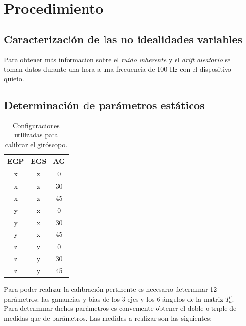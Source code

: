 \documentclass[main]{subfiles}
\begin{document}
\section{Procedimiento}
\subsection{Caracterización de las no idealidades variables}

Para obtener más información sobre el \emph{ruido inherente} y el \emph{drift aleatorio} se toman datos durante una hora a una frecuencia de 100 Hz con el dispositivo quieto.

\subsection{Determinación de parámetros estáticos}

\begin{table}
\vspace{-15pt}
\centering
\begin{small}
\begin{tabular}{|c|c|c|}
\hline
  {\cellcolor[gray]{0.85} \centering \textbf{EGP}}
& {\cellcolor[gray]{0.85} \centering \textbf{EGS}}
& {\cellcolor[gray]{0.85} \centering \textbf{AG}} \\ \hline  \hline
x & z & 0 \\ \hline
x & z & 30 \\ \hline
x & z & 45 \\ \hline
y & x & 0 \\ \hline
y & x & 30 \\ \hline
y & x & 45 \\ \hline
z & y & 0 \\ \hline
z & y & 30 \\ \hline
z & y & 45 \\ \hline
\end{tabular}
\caption{Configuraciones utilizadas para calibrar el giróscopo.}
\label{tab:gyros}
\end{small}
\vspace{-35pt}
\end{table}

Para poder realizar la calibración pertinente es necesario determinar 12 parámetros: las ganancias y bias de los 3 ejes y los 6 ángulos de la matriz $T^p_a$. Para determinar dichos parámetros es conveniente obtener el doble o triple de medidas que de parámetros. Las medidas a realizar son las siguientes:
\end{document}
